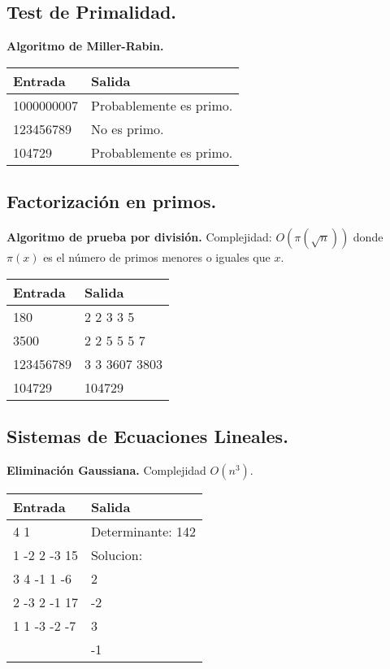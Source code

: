 \documentclass[10pt, letterpaper, twoside]{article}
\begin{document}


\subsection{Test de Primalidad.}

\textbf{Algoritmo de Miller-Rabin.}

 

\begin{tabular}{|p{7cm}|p{7cm}|}
\hline
\textbf{Entrada} & \textbf{Salida}\\ \hline
1000000007 & Probablemente es primo.\\
123456789  & No es primo.\\
104729     & Probablemente es primo.\\ \hline
\end{tabular}\bigskip

\subsection{Factorización en primos.}

\textbf{Algoritmo de prueba por división.} Complejidad: $O\left(\pi\left(\sqrt{n}\right)\right)$ donde $\pi(x)$ es el número de primos menores o iguales que $x$.



\begin{tabular}{|p{7cm}|p{7cm}|}
\hline
\textbf{Entrada} & \textbf{Salida}\\ \hline
180       & 2 2 3 3 5\\
3500      & 2 2 5 5 5 7\\ 
123456789 & 3 3 3607 3803\\
104729    & 104729\\ \hline
\end{tabular}\bigskip

\subsection{Sistemas de Ecuaciones Lineales.}

\textbf{Eliminación Gaussiana.} Complejidad $O(n^3)$.



\begin{tabular}{|p{7cm}|p{7cm}|}
\hline
\textbf{Entrada} & \textbf{Salida}\\ \hline
4 1          & Determinante: 142\\
1 -2 2 -3 15 & Solucion:\\ 
3 4 -1 1 -6  & 2\\ 
2 -3 2 -1 17 & -2\\ 
1 1 -3 -2 -7 & 3\\ 
             & -1\\ \hline
\end{tabular}\bigskip
\end{document}
